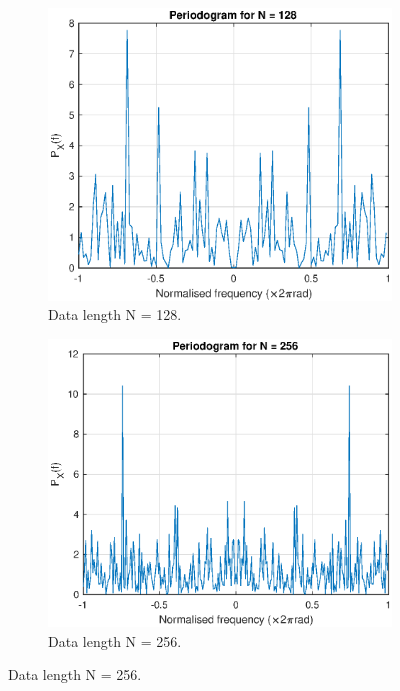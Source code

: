 \begin{figure}[H]
\begin{subfigure}{.32\textwidth}
  \centering
  \includegraphics[width=\linewidth]{assignment3figs/pgm_128.eps}  
  \caption{Data length N = 128.}
\end{subfigure}
\begin{subfigure}{.32\textwidth}
  \centering
  \includegraphics[width=\linewidth]{assignment3figs/pgm_256.eps}  
  \caption{Data length N = 256.}
\end{subfigure}

\end{figure}
